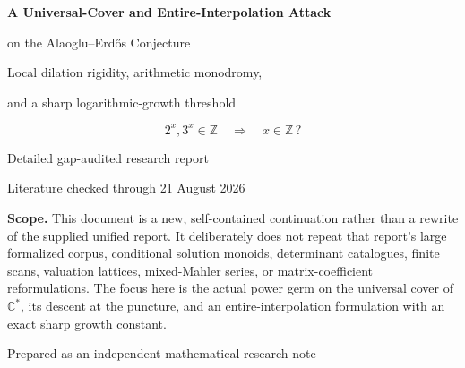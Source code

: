 \documentclass[11pt,oneside]{article}
\theoremstyle{definition}
\theoremstyle{remark}
\newcommand{\Z}{\mathbb Z}
\newcommand{\C}{\mathbb C}
\begin{document}
\hypersetup{pageanchor=false}
\begin{titlepage}
\centering
\vspace*{1.15cm}
{\sffamily\bfseries\color{navy}\fontsize{25}{30}\selectfont
A Universal-Cover and Entire-Interpolation Attack\par
on the Alaoglu--Erd\H{o}s Conjecture\par}
\vspace{0.55cm}
{\sffamily\Large\color{teal}
Local dilation rigidity, arithmetic monodromy,\par
and a sharp logarithmic-growth threshold}
\vspace{1.2cm}

\begin{tcolorbox}[width=0.91\textwidth,colback=softblue,colframe=navy,arc=2mm,boxrule=0.9pt]
\centering
\large
\[
2^x,3^x\in\Z \quad\Longrightarrow\quad x\in\Z\,?
\]
\end{tcolorbox}

\vspace{1.0cm}
{\large\sffamily Detailed gap-audited research report}\par
\vspace{0.25cm}
{\normalsize\sffamily Literature checked through 21 August 2026}\par
\vfill

\begin{minipage}{0.88\textwidth}
\small
\textbf{Scope.} This document is a new, self-contained continuation rather than a rewrite of the supplied unified report.  It deliberately does not repeat that report's large formalized corpus, conditional solution monoids, determinant catalogues, finite scans, valuation lattices, mixed-Mahler series, or matrix-coefficient reformulations.  The focus here is the actual power germ on the universal cover of \(\C^*\), its descent at the puncture, and an entire-interpolation formulation with an exact sharp growth constant.
\end{minipage}

\vspace{0.75cm}
{\small\sffamily Prepared as an independent mathematical research note}\par
\end{titlepage}
\hypersetup{pageanchor=true}
\end{document}
